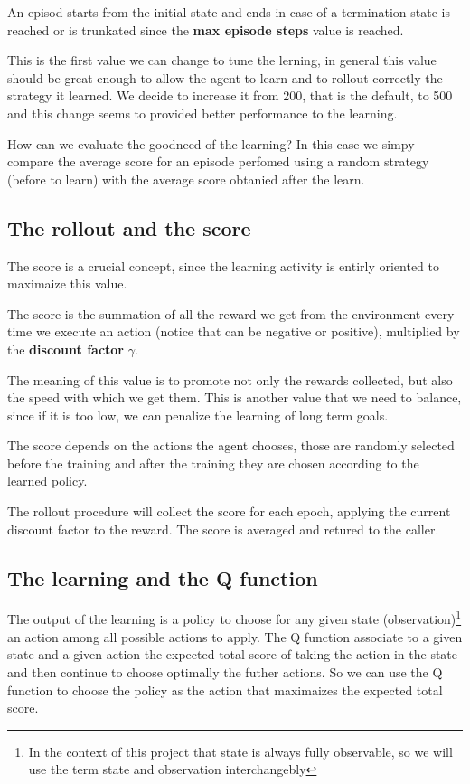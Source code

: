 \documentclass{article}
\begin{document}
An episod starts from the initial state and ends in case of a termination state is reached or is trunkated since the \textbf{max episode steps} value is reached.

This is the first value we can change to tune the lerning, in general this value should be great enough to allow the agent to learn and to rollout correctly the strategy it learned.
We decide to increase it from 200, that is the default, to 500 and this change seems to provided better performance to the learning.

How can we evaluate the goodneed of the learning? In this case we simpy compare the average score for an episode perfomed using a random strategy (before to learn)
with the average score obtanied after the learn.

\subsection{The rollout and the score}

The score is a crucial concept, since the learning activity is entirly oriented to maximaize this value.

The score is the summation of all the reward we get from the environment every time we execute an action (notice that can be negative or positive),
multiplied by the \textbf{discount factor} $\gamma$.

The meaning of this value is to promote not only the rewards collected, but also the speed with which we get them.
This is another value that we need to balance, since if it is too low, we can penalize the learning of long term goals.

The score depends on the actions the agent chooses, those are randomly selected before the training 
and after the training they are chosen according to the learned policy.

The rollout procedure will collect the score for each epoch, applying the current discount factor to the reward.
The score is averaged and retured to the caller.

\subsection{The learning and the Q function}

The output of the learning is a policy to choose for any given state (observation)\footnote[2]{
In the context of this project that state is always fully observable, so we will use the term state and observation interchangebly} 
an action among all possible actions to apply.
The Q function associate to a given state and a given action the expected total score of taking the action in the state 
and then continue to choose optimally the futher actions.
So we can use the Q function to choose the policy as the action that maximaizes the expected total score.
\end{document}
